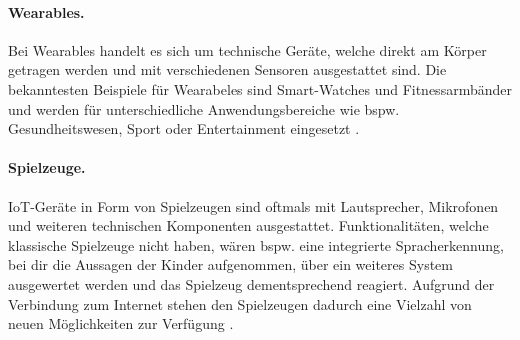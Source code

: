 \paragraph{Wearables.}
Bei Wearables handelt es sich um technische Geräte, welche direkt am Körper
getragen werden und mit verschiedenen Sensoren ausgestattet sind. Die
bekanntesten Beispiele für Wearabeles sind Smart-Watches und Fitnessarmbänder
und werden für unterschiedliche Anwendungsbereiche wie bspw. Gesundheitswesen,
Sport oder Entertainment eingesetzt \cite{paper}.

\paragraph{Spielzeuge.}
IoT-Geräte in Form von Spielzeugen sind oftmals mit Lautsprecher, Mikrofonen und
weiteren technischen Komponenten ausgestattet.  Funktionalitäten, welche
klassische Spielzeuge nicht haben, wären bspw. eine integrierte Spracherkennung,
bei dir die Aussagen der Kinder aufgenommen, über ein weiteres System
ausgewertet werden und das Spielzeug dementsprechend reagiert. Aufgrund der
Verbindung zum Internet stehen den Spielzeugen dadurch eine Vielzahl von neuen
Möglichkeiten zur Verfügung \cite{paper}.
